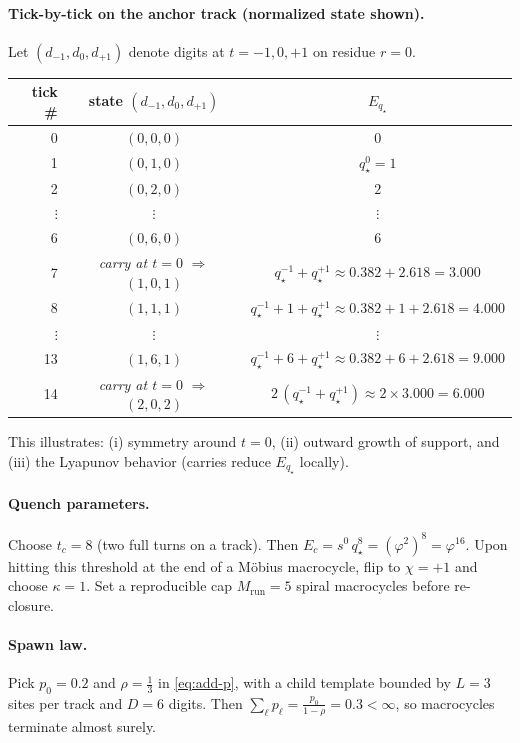 \documentclass[11pt]{article}
\theoremstyle{definition}
\theoremstyle{remark}
\begin{document}
\paragraph{Tick-by-tick on the anchor track (normalized state shown).}
Let $(d_{-1},d_0,d_{+1})$ denote digits at $t=-1,0,+1$ on residue $r=0$.
\begin{center}
\begin{tabular}{r|c|c}
tick \# & state $(d_{-1},d_0,d_{+1})$ & $E_{q_\star}$ \\ \hline
0 & $(0,0,0)$ & $0$ \\
1 & $(0,1,0)$ & $q_\star^0 = 1$ \\
2 & $(0,2,0)$ & $2$ \\
$\vdots$ & $\vdots$ & $\vdots$ \\
6 & $(0,6,0)$ & $6$ \\
7 & \textit{carry at $t{=}0$} $\Rightarrow$ $(1,0,1)$ & $q_\star^{-1}+q_\star^{+1}\approx 0.382+2.618=3.000$ \\
8 & $(1,1,1)$ & $q_\star^{-1}+1+q_\star^{+1}\approx 0.382+1+2.618=4.000$ \\
$\vdots$ & $\vdots$ & $\vdots$ \\
13 & $(1,6,1)$ & $q_\star^{-1}+6+q_\star^{+1}\approx 0.382+6+2.618=9.000$ \\
14 & \textit{carry at $t{=}0$} $\Rightarrow$ $(2,0,2)$ & $2\,(q_\star^{-1}+q_\star^{+1})\approx 2\times 3.000=6.000$ \\
\end{tabular}
\end{center}
This illustrates: (i) symmetry around $t=0$, (ii) outward growth of support, and (iii) the Lyapunov behavior (carries reduce $E_{q_\star}$ locally).

\paragraph{Quench parameters.}
Choose $t_c=8$ (two full turns on a track). Then $E_c = s^{0}\,q_\star^{8}=(\varphi^2)^8=\varphi^{16}$.
Upon hitting this threshold at the end of a M\"obius macrocycle, flip to $\chi=+1$ and choose $\kappa=1$.
Set a reproducible cap $M_{\mathrm{run}}=5$ spiral macrocycles before re-closure.

\paragraph{Spawn law.}
Pick $p_0=0.2$ and $\rho=\tfrac{1}{3}$ in \eqref{eq:add-p}, with a child template bounded by $L=3$ sites per track and $D=6$ digits. Then $\sum_\ell p_\ell = \frac{p_0}{1-\rho}=0.3<\infty$, so macrocycles terminate almost surely.
\end{document}
